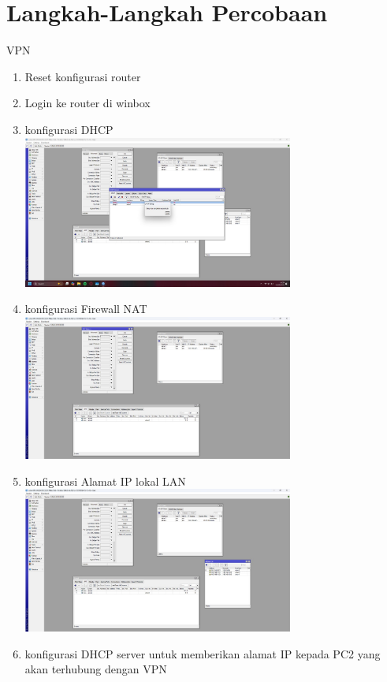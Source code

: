 \section{Langkah-Langkah Percobaan}
VPN
\begin{enumerate}
	\item Reset konfigurasi router
	\item Login ke router di winbox
	\item konfigurasi DHCP \\
	\includegraphics[width=0.7\textwidth]{P5/img/dhcp.jpg}
	\item konfigurasi Firewall NAT\\
	\includegraphics[width=0.7\textwidth]{P5/img/firewall.jpg}
	\item konfigurasi Alamat IP lokal LAN \\
	\includegraphics[width=0.7\textwidth]{P5/img/ip1.jpg}
	\item konfigurasi DHCP server untuk memberikan alamat IP kepada PC2 yang akan terhubung dengan VPN\\

\end{enumerate}
